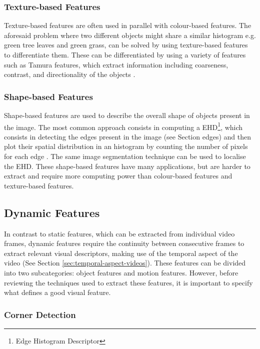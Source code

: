 \subsubsection{Texture-based Features}

Texture-based features are often used in parallel with colour-based features. The aforesaid problem where two different objects might share a similar histogram e.g. green tree leaves and green grass, can be solved by using texture-based features to differentiate them. These can be differentiated by using a variety of features such as Tamura features, which extract information including coarseness, contrast, and directionality of the objects \cite{amir2003ibm}. 

\subsubsection{Shape-based Features}

Shape-based features are used to describe the overall shape of objects present in the image. The most common approach consists in computing a EHD\footnote{Edge Histogram Descriptor}, which consists in detecting the edges present in the image (see Section edges) and then plot their spatial distribution in an histogram by counting the number of pixels for each edge \cite{hauptmann2004informedia}. The same image segmentation technique can be used to localise the EHD. These shape-based features have many applications, but are harder to extract and require more computing power than colour-based features and texture-based features.


\subsection{Dynamic Features}
\label{sec:dynamic-features}

In contrast to static features, which can be extracted from individual video frames, dynamic features require the continuity between consecutive frames to extract relevant visual descriptors, making use of the temporal aspect of the video (See Section \ref{sec:temporal-aspect-videos}). These features can be divided into two subcategories: object features and motion features. However, before reviewing the techniques used to extract these features, it is important to specify what defines a good visual feature.

\subsubsection{Corner Detection}

